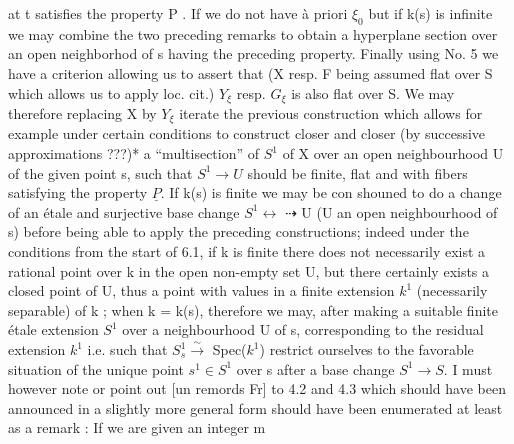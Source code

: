 
at t satisfies the property P . If we do not have à priori $\xi_0$ but
if k(s) is infinite we may combine the two preceding remarks to
obtain a hyperplane section over an open neighborhod of s having
the preceding property. Finally using No. 5 we have a criterion
allowing us to assert that (X resp. F being assumed flat over S
which allows us to apply loc. cit.) $Y_\xi$ resp. $G_\xi$ is also flat over
S. We may therefore replacing X by $Y_\xi$ iterate the previous
construction which allows for example under certain conditions to
construct closer and closer (by successive approximations ???)* a
``multisection'' of $S^1$ of X over an open neighbourhood U of the given
point s, such that $S^1 \to U$ should be finite, flat and with fibers
satisfying the property $\underline{P}$. If k(s) is finite we may be con
shouned to do a change of an étale and surjective base change $S^1 \leftrightarrow$
$\dashrightarrow$ U (U an open neighbourhood of s) before being able to apply
the preceding constructions; indeed under the conditions from the
start of 6.1, if k is finite there does not necessarily exist a
rational point over k in the open non-empty set U, but there
certainly exists a closed point of U, thus a point with values in
a finite extension $k^1$ (necessarily separable) of k ; when k =
k(s), therefore we may, after making a suitable finite étale
extension $S^1$ over a neighbourhood U of s, corresponding to the
residual extension $k^1$ i.e. such that $S^1_s \xrightarrow{\sim}$ Spec($k^1$) restrict
ourselves to the favorable situation of the unique point $s^1 \in S^1$
over s after a base change $S^1 \to S$. I must however note or point
out [un remords Fr] to 4.2 and 4.3 which should have been
announced in a slightly more general form should have been
enumerated at least as a remark : If we are given an integer m

